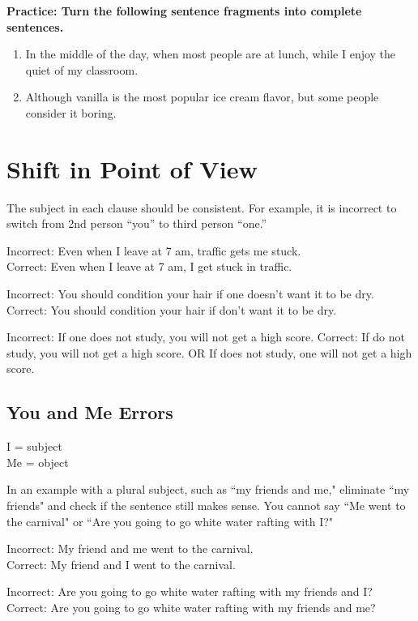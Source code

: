 \documentclass[12pt]{book}
\newcommand{\longline}{\underline{\hspace{2in}} }
\begin{document}
\bigskip
\textbf{Practice: Turn the following sentence fragments into complete sentences.}
\begin{enumerate}
\item{In the middle of the day, when most people are at lunch, while I enjoy the quiet of my classroom.} \hrulefill 
\item{Although vanilla is the most popular ice cream flavor, but some people consider it boring.} \hrulefill
\end{enumerate} 

\section{Shift in Point of View}
The subject in each clause should be consistent.  For example, it is incorrect to switch from 2nd person “you” to third person “one.”

\bigskip
Incorrect: Even when I leave at 7 am, traffic gets me stuck.\\
Correct:  Even when I leave at 7 am, I get stuck in traffic.

\bigskip
Incorrect:  You should condition your hair if one doesn't want it to be dry.
Correct:  You should condition your hair if \longline don't want it to be dry.

\bigskip
Incorrect: If one does not study, you will not get a high score.
Correct:  If \longline  do not study, you will not get a high score.  OR  If \longline  does not study, one will not get a high score.

\subsection{You and Me Errors}
I = subject\\
Me = object

\bigskip
In an example with a plural subject, such as ``my friends and me," eliminate ``my friends" and check if the sentence still makes sense.  You cannot say ``Me went to the carnival" or ``Are you going to go white water rafting with I?"

\bigskip
Incorrect:  My friend and me went to the carnival.\\
Correct:  My friend and I went to the carnival.

\bigskip
Incorrect:  Are you going to go white water rafting with my friends and I? \\
Correct:  Are you going to go white water rafting with my friends and me?
\end{document}
